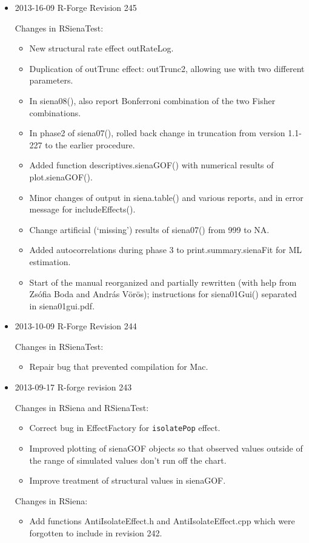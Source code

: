 \documentclass[a4paper,fleqn,11pt]{article}
\newcommand{\+}{\, + \,}
\newcommand{\sfn}[1]{\textsf{#1}}
\begin{document}
\begin{small}
\begin{itemize}
\item 2013-16-09 R-Forge Revision 245

Changes in RSienaTest:
\begin{itemize}
   \item New structural rate effect \sfn{outRateLog}.
   \item Duplication of \sfn{outTrunc} effect: \sfn{outTrunc2}, allowing use
    with two different parameters.
   \item In \sfn{siena08()}, also report Bonferroni combination
     of the two Fisher combinations.
   \item In phase2 of \sfn{siena07()}, rolled back change in truncation
     from version 1.1-227 to the earlier procedure.
   \item Added function \sfn{descriptives.sienaGOF()} with numerical results
   of \sfn{plot.sienaGOF()}.
   \item Minor changes of output in \sfn{siena.table()} and various reports,
    and in error message for \sfn{includeEffects()}.
   \item  Change artificial (`missing') results of \sfn{siena07()} from 999
    to NA.
   \item Added autocorrelations during phase 3 to \sfn{print.summary.sienaFit}
   for ML estimation.
   \item Start of the manual reorganized and partially rewritten (with help from
     Zs\'{o}fia Boda and Andr\'{a}s V\"{o}r\"{o}s); instructions for
     \sfn{siena01Gui()} separated in siena01gui.pdf.
  \end{itemize}

\item 2013-10-09 R-Forge Revision 244

Changes in RSienaTest:

\begin{itemize}
\item Repair bug that prevented compilation for Mac.
\end{itemize}

\item 2013-09-17 R-forge revision 243

Changes in RSiena and RSienaTest:
  \begin{itemize}
   \item Correct bug in \sfn{EffectFactory} for \texttt{isolatePop} effect.
   \item Improved plotting of \sfn{sienaGOF} objects so that observed values
     outside of the range of simulated values don't run off the chart.
   \item Improve treatment of structural values in \sfn{sienaGOF}.
  \end{itemize}
Changes in RSiena:
  \begin{itemize}
   \item Add functions \sfn{AntiIsolateEffect.h} and \sfn{AntiIsolateEffect.cpp}
     which were forgotten to include in revision 242.
  \end{itemize}


\end{itemize}
\end{small}
\end{document}
